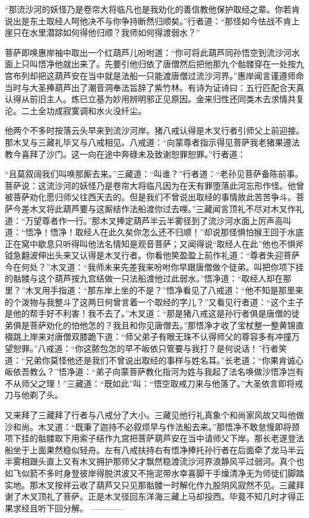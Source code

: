 \documentclass[12pt,UTF8]{ctexbook}
\begin{document}
“那流沙河的妖怪乃是卷帘大将临凡也是我劝化的善信教他保护取经之辈。你若肯说出是东土取经人呵他决不与你争持断然归顺矣。”行者道：“那怪如今怯战不肯上崖只在水里潜踪如何得他归顺？我师如何得渡弱水？”

菩萨即唤惠岸袖中取出一个红葫芦儿吩咐道：“你可将此葫芦同孙悟空到流沙河水面上只叫悟净他就出来了。先要引他归依了唐僧然后把他那九个骷髅穿在一处按九宫布列却把这葫芦安在当中就是法船一只能渡唐僧过流沙河界。”惠岸闻言谨遵师命当时与大圣捧葫芦出了潮音洞奉法旨辞了紫竹林。有诗为证诗曰：五行匹配合天真认得从前旧主人。炼已立基为妙用辨明邪正见原因。金来归性还同类木去求情共复沦。二土全功成寂寞调和水火没纤尘。

他两个不多时按落云头早来到流沙河岸。猪八戒认得是木叉行者引师父上前迎接。那木叉与三藏礼毕又与八戒相见。八戒道：“向蒙尊者指示得见菩萨我老猪果遵法教今喜拜了沙门。这一向在途中奔碌未及致谢恕罪恕罪。”行者道：

“且莫叙阔我们叫唤那厮去来。”三藏道：“叫谁？”行者道：“老孙见菩萨备陈前事。菩萨说：这流沙河的妖怪乃是卷帘大将临凡因为在天有罪堕落此河忘形作怪。他曾被菩萨劝化愿归师父往西天去的。但是我们不曾说出取经的事情故此苦苦争斗。菩萨今差木叉将此葫芦要与这厮结作法船渡你过去哩。”三藏闻言顶礼不尽对木叉作礼道：“万望尊者作一行。”那木叉捧定葫芦半云半雾径到了流沙河水面上厉声高叫道：“悟净！悟净！取经人在此久矣你怎么还不归顺！”却说那怪惧怕猴王回于水底正在窝中歇息只听得叫他法名情知是观音菩萨；又闻得说“取经人在此”他也不惧斧钺急翻波伸出头来又认得是木叉行者。你看他笑盈盈上前作礼道：“尊者失迎菩萨今在何处？”木叉道：“我师未来先差我来吩咐你早跟唐僧做个徒弟。叫把你项下挂的骷髅与这个葫芦按九宫结做一只法船渡他过此弱水。”悟净道：“取经人却在那里？”木叉用手指道：“那东岸上坐的不是？”悟净看见了八戒道：“他不知是那里来的个泼物与我整斗了这两日何曾言着一个取经的字儿？”又看见行者道：“这个主子是他的帮手好不利害！我不去了。”木叉道：“那是猪八戒这是孙行者俱是唐僧的徒弟俱是菩萨劝化的怕他怎的？我且和你见唐僧去。”那悟净才收了宝杖整一整黄锦直裰跳上岸来对唐僧双膝跪下道：“师父弟子有眼无珠不认得师父的尊容多有冲撞万望恕罪。”八戒道：“你这脓包怎的早不皈依只管要与我打？是何说话！”行者笑道：“兄弟你莫怪他还是我们不曾说出取经的事样与姓名耳。”长老道：“你果肯诚心皈依吾教么？”悟净道：“弟子向蒙菩萨教化指河为姓与我起了法名唤做沙悟净岂有不从师父之理！”三藏道：“既如此”叫：“悟空取戒刀来与他落了。”大圣依言即将戒刀与他剃了头。

又来拜了三藏拜了行者与八戒分了大小。三藏见他行礼真象个和尚家风故又叫他做沙和尚。木叉道：“既秉了迦持不必叙烦早与作法船去来。”那悟净不敢怠慢即将颈项下挂的骷髅取下用索子结作九宫把菩萨葫芦安在当中请师父下岸。那长老遂登法船坐于上面果然稳似轻舟。左有八戒扶持右有悟净捧托孙行者在后面牵了龙马半云半雾相跟头直上又有木叉拥护那师父才飘然稳渡流沙河界浪静风平过弱河。真个也如飞似箭不多时身登彼岸得脱洪波又不拖泥带水幸喜脚干手燥清净无为师徒们脚踏实地。那木叉按祥云收了葫芦又只见那骷髅一时解化作九股阴风寂然不见。三藏拜谢了木叉顶礼了菩萨。正是木叉径回东洋海三藏上马却投西。毕竟不知几时才得正果求经且听下回分解。
------------
\end{document}
